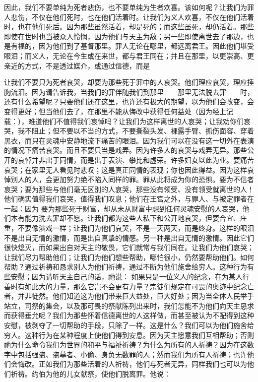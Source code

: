 因此，我们不要单纯为死者悲伤，也不要单纯为生者欢喜。该如何呢？让我们为罪人悲伤，不仅在他们死时，也在他们活着时。让我们为义人欢喜，不仅在他们活着时，也在他们死后。因为那些虽然活着，却是死的；而这些虽死，却仍活着。那些即使在世时也当被众人怜悯，因为他们与天主为敌；另一些即使离世去了那边，也是有福的，因为他们到了基督那里。罪人无论在哪里，都远离君王。因此他们堪受眼泪；而义人，无论在今生或在来世，都与君王同在；并且在那里，以更崇高、更亲近的方式，不是透过媒介，或通过信德，而是 \par

让我们不要只为死者哀哭，却要为那些死于罪中的人哀哭。他们理应哀哭，理应捶胸流泪。因为请告诉我，当我们的罪伴随我们到那里——那里无法脱去罪——时，还有什么希望呢？只要他们还在这里，也许还有极大的期望，以为他们会改变，会变得更好；但当他们去了，在那里不能从悔改中获得任何益处（因为经上记载：），难道他们不值得我们哀悼吗？让我们为这样离世的人哀哭；让我劝你们哀哭，我不阻止；但不要以不当的方式，不要撕裂头发、裸露手臂、抓伤面容、穿着黑衣，而只在灵魂中安静地流下痛苦的眼泪。因为我们可以在没有这一切外在表演的情况下痛苦哀哭。而且不要只当是戏弄。因为许多人的哀哭与戏弄无异。那些公开的哀悼并非出于同情，而是出于表演、攀比和虚荣。许多妇女以此为业。要痛苦哀哭；在家里无人看见时悲叹；这是真正同情的表现；你也因此得益。因为这样哀悼别人的人，会更加努力绝不陷入同样的罪。罪从此将成为你的恐惧。要为不信者哀哭；要为那些与他们毫无区别的人哀哭，那些没有领受、没有领受就离世的人！他们确实值得我们哀哭，值得我们叹息；他们在王宫之外，与罪人、与被定罪者在一起：因为 要为那些死于财富，却从未从财富中想到任何灵魂安慰的人哀哭，他们本有能力洗去罪却不愿。让我们都为这些人私下和公开地哀哭，但要合宜、庄重，不要像演戏一样；让我们为他们哀哭，不是一天两天，而是终身。这样的眼泪不是出自无情的激情，而是出自真挚的情感。另一种是出自无情的激情。因此它们很快熄灭，而如果出自对天主的敬畏，它们就常与我们同在。让我们为他们哀哭；让我们尽力帮助他们；让我们为他们想些帮助，哪怕很小，仍然要帮助他们。如何帮助？通过祈祷和恳求别人为他们祈祷，通过不断为他们施舍给穷人。这种行为有些安慰；因为请听天主自己的话，祂说： 如果只是一位义人的纪念，在为某人行善时有如此大的力量，那么它岂不会更有力量？宗徒们规定在可畏的奥迹中纪念亡者，并非徒然。他们知道这为他们带来巨大益处，巨大好处；因为当全体人民举手站立，司祭的集会，以及那可畏的祭献陈列出来时，我们怎能不为他们向天主恳求而获得垂允呢？我们为那些怀着信德离世的人这样做，而甚至被认为不配得到这种安慰，被剥夺了一切帮助的手段，只除了一样。这是什么？我们可以为他们施舍给穷人。这种行为在某种程度上使他们得到安息。因为天主愿意我们互相帮助；否则祂为什么命令我们为世界的和平与福祉祈祷？为什么为所有的人祈祷？因为在这数字中包括强盗、盗墓者、小偷、身负无数罪的人；然而我们为所有人祈祷；也许他们会悔改。正如我们为那些活着的人祈祷，他们与死者无异，同样我们也可以为他们祈祷。约伯为他的儿女献祭，使他们脱离罪。他说： 